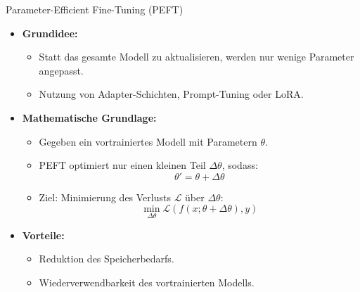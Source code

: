 \documentclass[aspectratio=1610, xcolor=dvipsnames, 9pt]{beamer}
\begin{document}
\begin{frame}{Parameter-Efficient Fine-Tuning (PEFT)}
  \begin{itemize}
    \item \textbf{Grundidee:}
      \begin{itemize}
        \item Statt das gesamte Modell zu aktualisieren, werden nur wenige Parameter angepasst.
        \item Nutzung von Adapter-Schichten, Prompt-Tuning oder LoRA.
      \end{itemize}
    \item \textbf{Mathematische Grundlage:}
      \begin{itemize}
        \item Gegeben ein vortrainiertes Modell mit Parametern \( \theta \).
        \item PEFT optimiert nur einen kleinen Teil \( \Delta \theta \), sodass:
          \[
          \theta' = \theta + \Delta \theta
          \]
        \item Ziel: Minimierung des Verlusts \( \mathcal{L} \) über \( \Delta \theta \):
          \[
          \min_{\Delta \theta} \mathcal{L}(f(x; \theta + \Delta \theta), y)
          \]
      \end{itemize}
    \item \textbf{Vorteile:}
      \begin{itemize}
        \item Reduktion des Speicherbedarfs.
        \item Wiederverwendbarkeit des vortrainierten Modells.
      \end{itemize}
  \end{itemize}
\end{frame}
\end{document}
